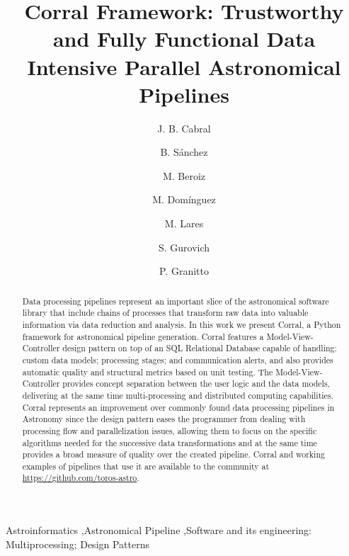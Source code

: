 \documentclass[final,5p,times,twocolumn,authoryear]{elsarticle}
\begin{document}
\begin{frontmatter}

\title{Corral Framework: Trustworthy and Fully Functional Data Intensive Parallel Astronomical Pipelines}

  \author[iate,fceia]{J. B. Cabral}

  \author[iate]{B. S\'anchez}
  \author[utrgv,utsa]{M. Beroiz}
  \author[iate]{M. Dom\'{i}nguez}
  \author[iate]{M. Lares}
  \author[iate]{S. Gurovich}
  \author[cifasis]{P. Granitto}

\address[iate]{
   Instituto De Astronom\'ia Te\'orica y Experimental -
   Observatorio Astron\'omico C\'ordoba (IATE--OAC--UNC--CONICET),
   Laprida 854, X5000BGR, C\'ordoba, Argentina.}
\address[fceia]{
   Facultad de Ciencias Exactas, Ingenier\'{i}a y Agrimensura, UNR,
   Pellegrini 250 - S2000BTP, Rosario, Argentina.}
\address[utrgv]{
   University of Texas Rio Grande Valley (UTRGV),
   One West University Blvd.
   Brownsville, Texas 78520, USA.}
\address[utsa]{
   University of Texas at San Antonio (UTSA),
   1 UTSA Circle, San Antonio, TX 78249, USA.}
\address[cifasis]{
   Centro Internacional Franco Argentino de Ciencias de la
   Informaci\'on y de Sistemas (CIFASIS, CONICET--UNR),
   Ocampo y Esmeralda, S2000EZP,
   Rosario, Argentina.}


\begin{abstract}
Data processing pipelines represent an important slice of 
the astronomical software library that include chains of processes 
that transform raw data into valuable information via data reduction and analysis.
%
In this work we present Corral, a Python framework for astronomical pipeline generation.
Corral features a Model-View-Controller design pattern on top of an SQL Relational Database
capable of handling: custom data models; processing stages; and communication alerts,
and also provides automatic quality and structural metrics based on unit testing.
%
The Model-View-Controller provides concept separation between the user logic and
the data models, delivering at the same time multi-processing
and distributed computing capabilities.
%
Corral represents an improvement over commonly found data processing
pipelines in Astronomy since the design pattern eases the programmer from dealing with processing flow and parallelization issues,
allowing them to focus on the specific algorithms needed for the successive data transformations and at the same time provides a broad measure of quality over the created pipeline.
%
Corral and working examples of pipelines that use it are available to the community
at \url{https://github.com/toros-astro}.
\end{abstract}


\begin{keyword}
   Astroinformatics \sep Astronomical Pipeline \sep Software and its engineering: Multiprocessing; Design Patterns
\end{keyword}

\end{frontmatter}
\end{document}
